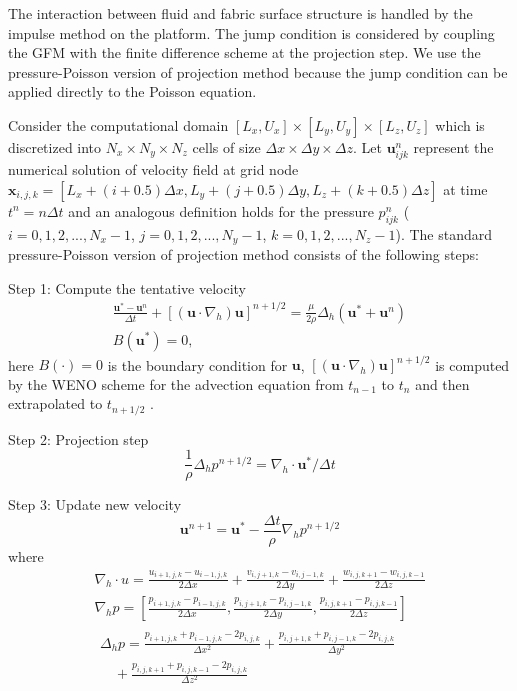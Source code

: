 The interaction between fluid and fabric surface structure is handled by the
impulse method \cite{KimLiLi12} on the \FronTierp platform. The jump condition
 is considered by coupling the GFM with the finite difference
scheme at the projection step. We use the pressure-Poisson version of
projection method because the jump condition can be applied directly to the
Poisson equation.

Consider the computational domain $[L_x,U_x]\times[L_y,U_y]\times[L_z,U_z]$
which is discretized into $N_x\times N_y\times N_z$ cells of size $\Delta
x\times\Delta y\times\Delta z$. Let $\mathbf{u}^n_{ijk}$ represent the
numerical solution of velocity field at grid node  $\mathbf{x}_{i,j,k} =
[L_x+(i+0.5)\Delta x,L_y+(j+0.5)\Delta y, L_z+(k+0.5)\Delta z]$ at time $t^n =
n\Delta t$ and an analogous definition holds for the pressure $p^n_{ijk}$ ($i =
0,1,2,...,N_x-1$, $j = 0,1,2,...,N_y-1$, $k = 0,1,2,...,N_z-1$). The standard
pressure-Poisson version of projection method consists of the following steps:

Step 1: Compute the tentative velocity
\begin{eqnarray}
\frac{\mathbf{u}^*-\mathbf{u}^n}{\Delta t}+
[(\mathbf{u}\cdot\nabla_h)\mathbf{u}]^{n+1/2}
=\frac{\mu}{2\rho}\Delta_h(\mathbf{u}^*+\mathbf{u}^n)\\ B(\mathbf{u}^*) = 0,
\end{eqnarray} here $B(\cdot) = 0$ is the boundary condition for $\mathbf{u}$,
$[(\mathbf{u}\cdot\nabla_h)\mathbf{u}]^{n+1/2}$ is computed by the WENO scheme
\cite{WENO96} for the advection equation from $t_{n-1}$ to $t_{n}$ and then
extrapolated to $t_{n+1/2}$ \cite{KimMoin85}.

Step 2: Projection step
\begin{equation} \frac{1}{\rho}\Delta_h p^{n+1/2} =
\nabla_h\cdot \mathbf{u}^*/\Delta t \label{proj} \end{equation}

Step 3: Update new velocity
\begin{equation} \mathbf{u}^{n+1} = \mathbf{u}^* -
\frac{\Delta t}{\rho}\nabla_h p^{n+1/2} \label{newvel} \end{equation}
where
\begin{eqnarray} \label{divU} \nabla_h\cdot u =
\frac{u_{i+1,j,k}-u_{i-1,j,k}}{2\Delta x} +
\frac{v_{i,j+1,k}-v_{i,j-1,k}}{2\Delta y} +
\frac{w_{i,j,k+1}-w_{i,j,k-1}}{2\Delta z}\\ \label{gradP} \nabla_h p =
[\frac{p_{i+1,j,k}-p_{i-1,j,k}}{2\Delta x},
\frac{p_{i,j+1,k}-p_{i,j-1,k}}{2\Delta y},
\frac{p_{i,j,k+1}-p_{i,j,k-1}}{2\Delta z}]\\    \label{lapP} 
\begin{aligned}
\Delta_h p = \frac{p_{i+1,j,k}+p_{i-1,j,k}-2p_{i,j,k}}{\Delta x^2} +
\frac{p_{i,j+1,k}+p_{i,j-1,k}-2p_{i,j,k}}{\Delta y^2} \\ \quad
+\frac{p_{i,j,k+1}+p_{i,j,k-1}-2p_{i,j,k}}{\Delta z^2} \end{aligned}
\end{eqnarray}


